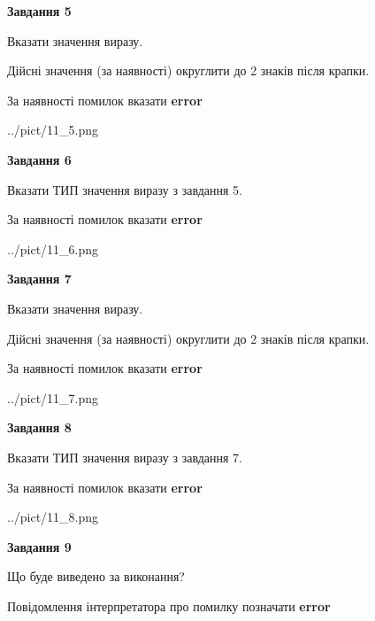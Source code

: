 \documentclass[11pt, ukrainian]{article}
\begin{document}
{\begin {large}
{\begin {center}\textbf{Завдання 5}\end {center}}\par
Вказати значення виразу. \par
Дійсні значення (за наявності) округлити до 2 знаків після крапки. \par
За наявності помилок вказати \textbf{error}

\begin{center}
	{../pict/11_5.png}
\end{center}
\newpage

{\begin {center}\textbf{Завдання 6}\end {center}}\par
Вказати ТИП значення виразу з завдання 5. \par
За наявності помилок вказати \textbf{error}

\begin{center}
	{../pict/11_6.png}
\end{center}
\newpage

{\begin {center}\textbf{Завдання 7}\end {center}}\par
Вказати значення виразу. \par
Дійсні значення (за наявності) округлити до 2 знаків після крапки. \par
За наявності помилок вказати \textbf{error}

\begin{center}
	{../pict/11_7.png}
\end{center}
\newpage

{\begin {center}\textbf{Завдання 8}\end {center}}\par
Вказати ТИП значення виразу з завдання 7. \par
За наявності помилок вказати \textbf{error}

\begin{center}
	{../pict/11_8.png}
\end{center}
\newpage

{\begin {center}\textbf{Завдання 9}\end {center}}\par
Що буде виведено за виконання? \par
Повідомлення інтерпретатора про помилку позначати \textbf{error}


\end{large}}
\end{document}
